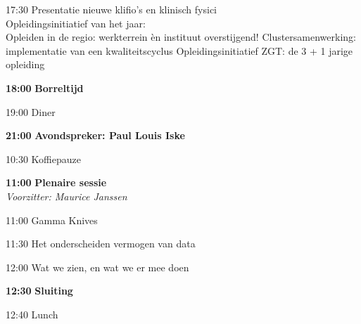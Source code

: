 \documentclass[a4paper,10pt]{report}
\begin{document}
\begin{multicols*}{3}
\begin{packed_enum}
        \vfill\strut
    \columnbreak
{} %
    \vfill
\item[17:30] Presentatie nieuwe klifio's en klinisch fysici\vspace{2mm}\\Opleidingsinitiatief van het jaar:\vspace{2mm}\\
    \noindent
    Opleiden in de regio: werkterrein èn instituut overstijgend! 
    \vspace{1mm}
    Clustersamenwerking: implementatie van een kwa\-li\-teits\-cyclus 
    \vspace{1mm}
    Opleidingsinitiatief ZGT: de 3 + 1 jarige opleiding 
        \vfill
    \item[\textbf{18:00}] {\textbf{Borreltijd}}
        \vfill
    \item[19:00] Diner
        \vfill
    \item[\textbf{21:00}] {\textbf{Avondspreker: Paul Louis Iske}}
    \end{packed_enum}%

\vfill
{} %

\begin{packed_enum}
\item[{\color{DarkBlue}{\textbf{09:00}}}]{ }
        \vfill
\item[10:30] Koffiepauze
        \vfill
\item[\textbf{11:00}] {\textbf{Plenaire sessie}}\\\textit{Voorzitter: Maurice Janssen}
\item[11:00] Gamma Knives
\item[11:30] Het onderscheiden vermogen van data
\item[12:00] Wat we zien, en wat we er mee doen
        \vfill
\item[\textbf{12:30}] \textbf{Sluiting}
\vfill
\item[12:40] Lunch
\end{packed_enum}%


\end{multicols*}
\end{document}
